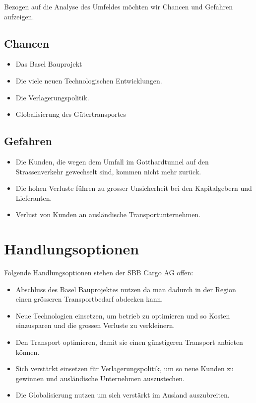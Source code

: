 \documentclass{article}
\begin{document}
Bezogen auf die Analyse des Umfeldes möchten wir Chancen und Gefahren aufzeigen.

\subsection{Chancen}
\begin{itemize}
    \item Das Basel Bauprojekt
    \item Die viele neuen Technologischen Entwicklungen.
    \item Die Verlagerungspolitik.
    \item Globalisierung des Gütertransportes
\end{itemize}
\subsection{Gefahren}
\begin{itemize}
    \item Die Kunden, die wegen dem Umfall im Gotthardtunnel auf den Strassenverkehr gewechselt sind, kommen nicht mehr zurück.
    \item Die hohen Verluste führen zu grosser Unsicherheit bei den Kapitalgebern und Lieferanten.
    \item Verlust von Kunden an ausländische Transportunternehmen.
\end{itemize}

\section{Handlungsoptionen}

Folgende Handlungsoptionen stehen der SBB Cargo AG offen:

\begin{itemize}
    \item Abschluss des Basel Bauprojektes nutzen da man dadurch in der Region einen grösseren Transportbedarf abdecken kann. 
    \item Neue Technologien einsetzen, um betrieb zu optimieren und so Kosten einzusparen und die grossen Verluste zu verkleinern. 
    \item Den Transport optimieren, damit sie einen günstigeren Transport anbieten können. 
    \item Sich verstärkt einsetzen für Verlagerungspolitik, um so neue Kunden zu gewinnen und ausländische Unternehmen auszustechen. 
    \item Die Globalisierung nutzen um sich verstärkt im Ausland auszubreiten. 
\end{itemize}
\end{document}
